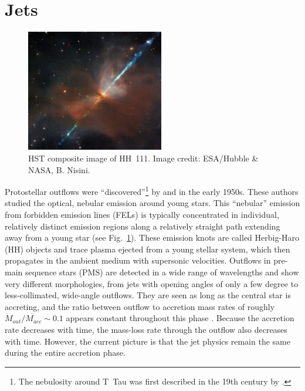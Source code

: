 
\section{Jets}


\begin{figure}[t]
 \centering
\includegraphics[width=6cm]{figs/HH111_-_HST_-_Potw2135a.jpg}
\caption{HST composite image of HH~111. Image credit: ESA/Hubble \& NASA, B. Nisini. \label{fig:HH111} }
\end{figure}



Protostellar outflows  were ``discovered''\footnote{The nebulosity around T~Tau was first described in the 19th century  by \citet{Burnham_1890, Burnham_1894}.} by \citet{Herbig_1950,Herbig_1951} and \citet{Haro_1952,Haro_1953} in the early 1950s. These authors studied the optical, nebular emission around young stars. This ``nebular'' emission from forbidden emission lines (FELs) is typically concentrated in individual, relatively distinct emission regions along a relatively straight path extending away from a young star (see Fig.~\ref{fig:HH111}). These emission knots  are called Herbig-Haro (HH) objects and trace plasma ejected from a young stellar system, which then propagates in the ambient medium with supersonic velocities. Outflows in pre-main sequence stars (PMS) are detected in a wide range of wavelengths and show very different morphologies, from jets with opening angles of only a few degree to less-collimated, wide-angle outflows. 
They are seen as long as the central star is accreting, and the ratio between outflow to accretion mass rates of roughly $\dot{M}_{out}/\dot{M_{acc}}\sim0.1$ appears constant throughout this phase \citep[e.g.,][]{Cabrit_2007, Nisini_2018}. Because the accretion rate decreases with time, the mass-loss rate through the outflow also decreases with time. However, the current picture is that the jet physics remain the same during the entire accretion phase.

